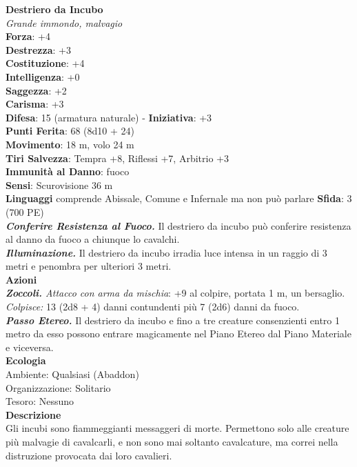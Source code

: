 \begin{multicols}{2}
\medskip\textbf{Destriero da Incubo}\\
\emph{Grande immondo, malvagio}\\
\textbf{Forza}: +4\\
\textbf{Destrezza}: +3\\
\textbf{Costituzione}: +4\\
\textbf{Intelligenza}: +0\\
\textbf{Saggezza}: +2\\
\textbf{Carisma}: +3\\
\textbf{Difesa}: 15 (armatura naturale) - \textbf{Iniziativa}: +3\\
\textbf{Punti Ferita}: 68 (8d10 + 24)\\
\textbf{Movimento}: 18 m, volo 24 m\\
\textbf{Tiri Salvezza}: Tempra +8, Riflessi +7, Arbitrio +3\\
\textbf{Immunità al Danno}: fuoco\\
\textbf{Sensi}: Scurovisione 36 m\\
\textbf{Linguaggi} comprende Abissale, Comune e Infernale ma non può parlare
\textbf{Sfida}: 3 (700 PE)\smallskip\\
\emph{\textbf{Conferire Resistenza al Fuoco.}} Il destriero da incubo può conferire resistenza al danno da fuoco a chiunque lo cavalchi.\\
\emph{\textbf{Illuminazione.}} Il destriero da incubo irradia luce intensa in un raggio di 3 metri e penombra per ulteriori 3 metri.\\
\smallskip\textbf{Azioni}\\
\emph{\textbf{Zoccoli.} Attacco con arma da mischia}: +9 al colpire, portata 1 m, un bersaglio.\\
\emph{Colpisce:} 13 (2d8 + 4) danni contundenti più 7 (2d6) danni da fuoco.\\
\emph{\textbf{Passo Etereo.}} Il destriero da incubo e fino a tre creature consenzienti entro 1 metro da esso possono entrare magicamente nel Piano Etereo dal Piano Materiale e viceversa.\\
\textbf{Ecologia}\\
Ambiente: Qualsiasi (Abaddon)\\
Organizzazione: Solitario\\
Tesoro: Nessuno\\
\textbf{Descrizione}\\
Gli incubi sono fiammeggianti messaggeri di morte. Permettono solo alle creature più malvagie di cavalcarli, e non sono mai soltanto cavalcature, ma correi nella distruzione provocata dai loro cavalieri.\\


\end{multicols}
